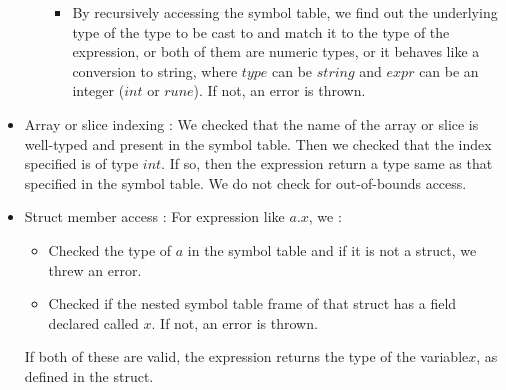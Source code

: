 \documentclass[preprint,12pt]{elsarticle}
\begin{document}
\begin{itemize}
\begin{itemize}
\begin{itemize}
\item By recursively accessing the symbol table, we find out the underlying type of the type to be cast to and match it to the type of the expression, or both of them are numeric types, or it behaves like a conversion to string, where $type$ can be $string$ and $expr$ can be an integer ($int$ or $rune$). If not, an error is thrown.
\end{itemize}
\end{itemize}
\item Array or slice indexing : We checked that the name of the array or slice is well-typed and present in the symbol table. Then we checked that the index specified is of type $int$. If so, then the expression return a type same as that specified in the symbol table. We do not check for out-of-bounds access.
\item Struct member access : For expression like $a.x$, we : 
\begin{itemize}
\item Checked the type of $a$ in the symbol table and if it is not a struct, we threw an error. 
\item Checked if the nested symbol table frame of that struct has a field declared called $x$. If not, an error is thrown.
\end{itemize}
If both of these are valid, the expression returns the type of the variable$x$, as defined in the struct.
\end{itemize}
\end{document}
